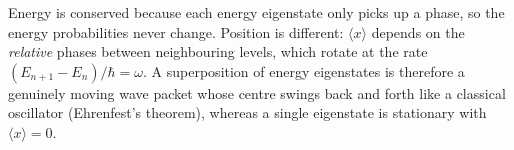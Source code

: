 \begin{insightbox}
Energy is conserved because each energy eigenstate only picks up a phase, so the energy probabilities never change. Position is different: $\langle x\rangle$ depends on the \emph{relative} phases between neighbouring levels, which rotate at the rate $(E_{n+1}-E_n)/\hbar=\omega$. A superposition of energy eigenstates is therefore a genuinely moving wave packet whose centre swings back and forth like a classical oscillator (Ehrenfest's theorem), whereas a single eigenstate is stationary with $\langle x\rangle=0$.
\end{insightbox}
